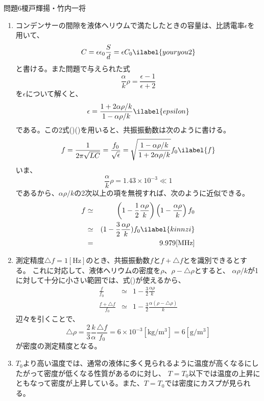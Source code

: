 \documentclass[fleqn]{jbook}
\begin{document}
\begin{answer}{問題6}{榎戸輝揚・竹内一将}
\begin{enumerate}
\item 
コンデンサーの間隙を液体ヘリウムで満たしたときの容量は、比誘電率$\epsilon$を用いて、
\begin{eqnarray}
C=\epsilon \epsilon_0 \frac{S}{d}=\epsilon C_0
\ilabel{youryou2}
\end{eqnarray}
と書ける。また問題で与えられた式
\[
\frac{\alpha}{k}\rho=\frac{\epsilon-1}{\epsilon +2}
\]
を$\epsilon$について解くと、
\begin{eqnarray}
\epsilon=\frac{1+2\alpha \rho/k}{1-\alpha \rho/k}
\ilabel{epsilon}
\end{eqnarray}
である。この2式()()を用いると、共振振動数は次のように書ける。
\begin{eqnarray}
f=\frac{1}{2\pi \sqrt{LC}}=\frac{f_0}{\sqrt{\epsilon}}=\sqrt{\frac{1-\alpha \rho/k}{1+2\alpha \rho/k}}f_0
\ilabel{f}
\end{eqnarray}
いま、
\[
\frac{\alpha}{k}\rho=1.43\times 10^{-3} \ll 1
\]
であるから、$\alpha \rho/k$の2次以上の項を無視すれば、次のように近似できる。
\begin{eqnarray}
f &\simeq& \left(1-\frac{1}{2}\frac{\alpha \rho}{k}\right) \left(1-\frac{\alpha \rho}{k} \right)f_0 \nonumber\\
& \simeq & (1-\frac{3}{2}\frac{\alpha \rho}{k})f_0 \ilabel{kinnzi}\\
&=&9.979[\mathrm{MHz}] \nonumber %
\end{eqnarray}


\item 
測定精度$\triangle f=1[\mathrm{Hz}]$のとき、共振振動数$f$と$f+\triangle f$とを識別できるとする。
これに対応して、液体ヘリウムの密度を$\rho$、$\rho - \triangle \rho$とすると、
$\alpha \rho/k$が1に対して十分に小さい範囲では、式()が使えるから、
\begin{eqnarray*}
\frac{f}{f_0}&\simeq& 1-\frac{3}{2}\frac{\alpha \rho}{k}\\
\frac{f+\triangle f}{f_0}&\simeq& 1-\frac{3}{2}\frac{\alpha (\rho-\triangle \rho)}{k}
\end{eqnarray*}
辺々を引くことで、
\[
\triangle \rho=\frac{2}{3}\frac{k}{\alpha}\frac{\triangle f}{f_0}=6\times 10^{-3}[\mathrm{kg/m^3}]=6[\mathrm{g/m^3}]
\]
が密度の測定精度となる。\par

\item
$T_0$より高い温度では、通常の液体に多く見られるように温度が高くなるにしたがって密度が低くなる性質があるのに対し、
$T=T_0$以下では温度の上昇にともなって密度が上昇している。また、$T=T_0$では密度にカスプが見られる。\par


\end{enumerate}
\end{answer}
\end{document}
